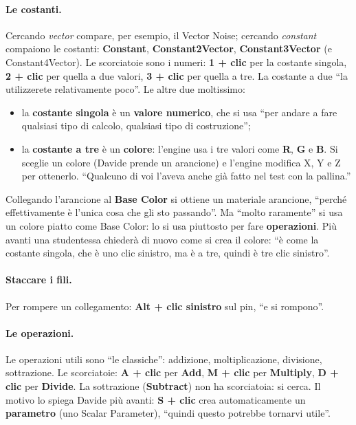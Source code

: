 \paragraph{Le costanti.} Cercando \emph{vector} compare, per esempio, il Vector
Noise; cercando \emph{constant} compaiono le costanti: \textbf{Constant},
\textbf{Constant2Vector}, \textbf{Constant3Vector} (e Constant4Vector). Le scorciatoie
sono i numeri: \textbf{1 + clic} per la costante singola, \textbf{2 + clic} per quella
a due valori, \textbf{3 + clic} per quella a tre. La costante a due ``la utilizzerete
relativamente poco''. Le altre due moltissimo:
\begin{itemize}
  \item la \textbf{costante singola} è un \textbf{valore numerico}, che si usa ``per
        andare a fare qualsiasi tipo di calcolo, qualsiasi tipo di costruzione'';
  \item la \textbf{costante a tre} è un \textbf{colore}: l'engine usa i tre valori come
        \textbf{R}, \textbf{G} e \textbf{B}. Si sceglie un colore (Davide prende un
        arancione) e l'engine modifica X, Y e Z per ottenerlo. ``Qualcuno di voi l'aveva
        anche già fatto nel test con la pallina.''
\end{itemize}
Collegando l'arancione al \textbf{Base Color} si ottiene un materiale arancione,
``perché effettivamente è l'unica cosa che gli sto passando''. Ma ``molto raramente''
si usa un colore piatto come Base Color: lo si usa piuttosto per fare
\textbf{operazioni}. Più avanti una studentessa chiederà di nuovo come si crea il colore:
``è come la costante singola, che è uno clic sinistro, ma è a tre, quindi è tre clic
sinistro''.

\paragraph{Staccare i fili.} Per rompere un collegamento: \textbf{Alt + clic sinistro}
sul pin, ``e si rompono''.

\paragraph{Le operazioni.} Le operazioni utili sono ``le classiche'': addizione,
moltiplicazione, divisione, sottrazione. Le scorciatoie: \textbf{A + clic} per
\textbf{Add}, \textbf{M + clic} per \textbf{Multiply}, \textbf{D + clic} per
\textbf{Divide}. La sottrazione (\textbf{Subtract}) non ha scorciatoia: si cerca. Il
motivo lo spiega Davide più avanti: \textbf{S + clic} crea automaticamente un
\textbf{parametro} (uno Scalar Parameter), ``quindi questo potrebbe tornarvi utile''.

